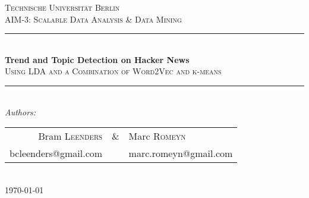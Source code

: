 %
%

\begin{titlepage}

\newcommand{\HRule}{\rule{\linewidth}{0.5mm}} %

\center %
 
\textsc{\LARGE Technische Universit\"at Berlin}\\[1.5cm] %
\textsc{\Large AIM-3: Scalable Data Analysis \& Data Mining}\\[0.5cm] %

\HRule \\[0.4cm]
{ \huge \bfseries Trend and Topic Detection on Hacker News}\\[0.4cm]
\textsc{\large Using LDA and a Combination of Word2Vec and k-means}\\[0.5cm] %


\HRule \\[1.5cm]
\Large \emph{Authors:}\\[0.5cm]

\begin{tabular}{rcl}
	Bram \textsc{Leenders} &\&& Marc \textsc{Romeyn}\\
	\small{bcleenders@gmail.com} & & \small{marc.romeyn@gmail.com}
\end{tabular}
\\[3cm]

{\large \today}\\[3cm] 


\vfill %

\end{titlepage}
